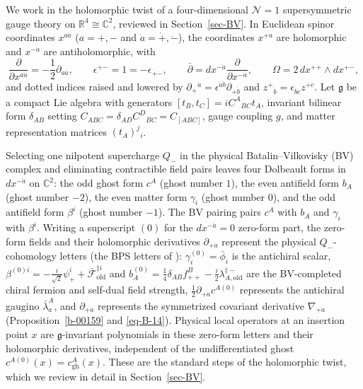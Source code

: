 \documentclass[11pt]{article}
\numberwithin{equation}{section}
\numberwithin{figure}{section}
\numberwithin{table}{section}
\begin{document}
We work in the holomorphic twist of a four-dimensional $\mathcal N=1$ supersymmetric gauge theory on $\mathbb R^4\cong\mathbb C^2$, reviewed in Section~\ref{sec-BV}. In Euclidean spinor coordinates $x^{a\dot a}$ ($a=+,-$ and $\dot a=\dot+,\dot-$), the coordinates $x^{+\dot a}$ are holomorphic and $x^{-\dot a}$ are antiholomorphic, with
\begin{equation}\label{eq-sum-spinor-conventions}
\frac{\partial}{\partial x^{a\dot a}}=-\frac12\partial_{a\dot a},\qquad
\epsilon^{\dot+\dot-}=1=-\epsilon_{\dot+\dot-},\qquad
\bar\partial=dx^{-\dot a}\frac{\partial}{\partial x^{-\dot a}},\qquad
\Omega=2\,dx^{+\dot+}\wedge dx^{+\dot-},
\end{equation}
and dotted indices raised and lowered by $\partial_+{}^{\dot a}=\epsilon^{\dot a\dot b}\partial_{+\dot b}$ and $z^+{}_{\dot b}=\epsilon_{\dot b\dot c}z^{+\dot c}$. Let $\mathfrak g$ be a compact Lie algebra with generators $[t_B,t_C]=iC^A{}_{BC}t_A$, invariant bilinear form $\delta_{AB}$ setting $C_{ABC}=\delta_{AD}C^D{}_{BC}=C_{[ABC]}$, gauge coupling $g$, and matter representation matrices $(t_A)^j{}_i$.

Selecting one nilpotent supercharge $Q_-$ in the physical Batalin--Vilkovisky (BV) complex and eliminating contractible field pairs leaves four Dolbeault forms in $dx^{-\dot a}$ on $\mathbb C^2$: the odd ghost form $c^A$ (ghost number $1$), the even antifield form $b_A$ (ghost number $-2$), the even matter form $\gamma_i$ (ghost number $0$), and the odd antifield form $\beta^i$ (ghost number $-1$). The BV pairing pairs $c^A$ with $b_A$ and $\gamma_i$ with $\beta^i$. Writing a superscript $(0)$ for the $dx^{-\dot a}=0$ zero-form part, the zero-form fields and their holomorphic derivatives $\partial_{+\dot a}$ represent the physical $Q_-$-cohomology letters (the BPS letters of \cite[Section 2]{ChangYin}): $\gamma_i^{(0)}=\bar\phi_i$ is the antichiral scalar, $\beta^{(0)i}=-\tfrac i{\sqrt2}\psi_+^i+\bar{\mathcal F}_{\mathrm{old}}^{\ddagger i}$ and $b_A^{(0)}=\tfrac14\delta_{AB}f_{++}^B-\tfrac i2\lambda_{A,\mathrm{old}}^{\ddagger-}$ are the BV-completed chiral fermion and self-dual field strength, $\tfrac12\partial_{+\dot a}c^{A(0)}$ represents the antichiral gaugino $\bar\lambda_{\dot a}^A$, and $\partial_{+\dot a}$ represents the symmetrized covariant derivative $\nabla_{+\dot a}$ (Proposition~\ref{b-00159} and \eqref{eq-B-14}). Physical local operators at an insertion point $x$ are $\mathfrak g$-invariant polynomials in these zero-form letters and their holomorphic derivatives, independent of the undifferentiated ghost $c^{A(0)}(x)=c_{\mathrm{gh}}^A(x)$. These are the standard steps of the holomorphic twist, which we review in detail in Section~\ref{sec-BV}.
\end{document}
